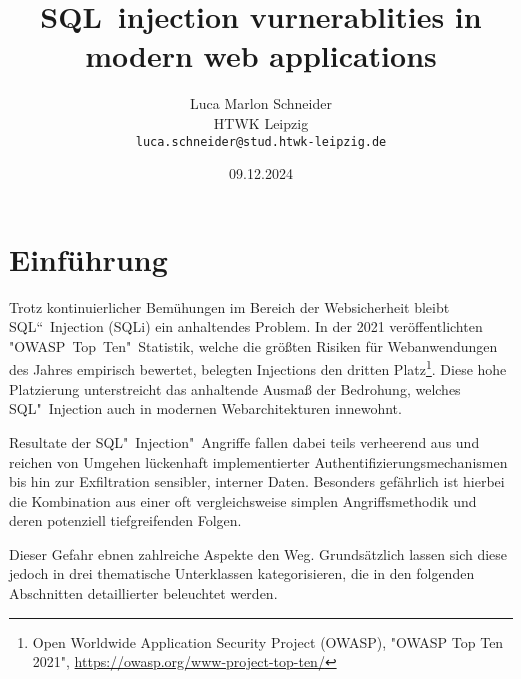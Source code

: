 \documentclass[a4paper,10pt,parskip,twocolumn]{article}
\title{SQL~injection vurnerablities in modern web applications}
\author{
	\Large Luca Marlon Schneider \\[2mm]
	\normalsize HTWK Leipzig \\
	\texttt{luca.schneider@stud.htwk-leipzig.de}
}
\date{09.12.2024}
\begin{document}


\section{Einführung}

    Trotz kontinuierlicher Bemühungen im Bereich der Websicherheit bleibt SQL“~Injection (SQLi) ein anhaltendes Problem. In der 2021 veröffentlichten "OWASP~Top~Ten"\ Statistik, welche die größten Risiken für Webanwendungen des Jahres empirisch bewertet, belegten Injections den dritten Platz\footnote{Open Worldwide Application Security Project (OWASP), "OWASP Top Ten 2021", \url{https://owasp.org/www-project-top-ten/}}. Diese hohe Platzierung unterstreicht das anhaltende Ausmaß der Bedrohung, welches SQL"~Injection auch in modernen Webarchitekturen innewohnt.\par
    Resultate der SQL"~Injection"~Angriffe fallen dabei teils verheerend aus und reichen von Umgehen 
    lückenhaft implementierter Authentifizierungsmechanismen bis hin zur Exfiltration sensibler, interner Daten. Besonders gefährlich ist hierbei die Kombination aus einer oft vergleichsweise simplen Angriffsmethodik und deren potenziell tiefgreifenden Folgen.\par
    Dieser Gefahr ebnen zahlreiche Aspekte den Weg. Grundsätzlich lassen sich diese jedoch in drei thematische Unterklassen kategorisieren, die in den folgenden Abschnitten detaillierter beleuchtet werden.
\end{document}
